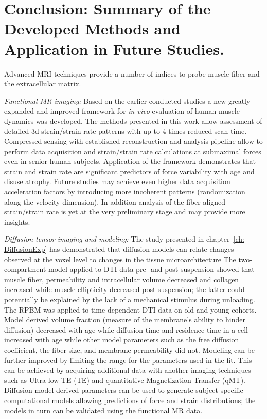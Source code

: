 \chapter{Conclusion: Summary of the Developed Methods and Application in Future Studies.}
Advanced MRI techniques provide a number of indices to probe muscle fiber and the extracellular matrix. 

\textit{Functional MR imaging:} Based on the earlier conducted studies a new greatly expanded and improved framework for \textit{in-vivo} evaluation of human muscle dynamics was developed.
The methods presented in this work allow assessment of detailed 3d strain/strain rate patterns with up to 4 times reduced scan time.
Compressed sensing with established reconstruction and analysis pipeline allow to perform data acquisition and strain/strain rate calculations at submaximal forces even in senior human subjects.
Application of the framework demonstrates that strain and strain rate are significant predictors of force variability with age and disuse atrophy.
Future studies may achieve even higher data acquisition acceleration factors by introducing more incoherent patterns (randomization along the velocity dimension).
In addition analysis of the fiber aligned strain/strain rate is yet at the very preliminary stage and may provide more insights.

\textit{Diffusion tensor imaging and modeling:} The study presented in chapter~\ref{ch: DiffusionExp} has demonstrated that diffusion models can relate changes observed at the voxel level to changes in the tissue microarchitecture
The two-compartment model applied to DTI data pre- and post-suspension showed that muscle fiber, permeability and intracellular volume decreased and collagen increased while muscle ellipticity decreased post-suspension; the latter could potentially be explained by the lack of a mechanical stimulus during unloading. 
The RPBM was applied to time dependent DTI data on old and young cohorts.
Model derived volume fraction (measure of the membrane’s ability to hinder diffusion) decreased with age while diffusion time and residence time in a cell increased with age while other model parameters such as the free diffusion coefficient, the fiber size, and membrane permeability did not.
Modeling can be further improved by limiting the range for the parameters used in the fit.
This can be achieved by acquiring additional data with another imaging techniques such as Ultra-low TE (TE) and quantitative Magnetization Transfer (qMT).
Diffusion model-derived parameters can be used to generate subject specific computational models allowing predictions of force and strain distributions; the models in turn can be validated using the functional MR data.

